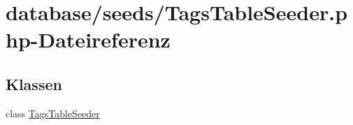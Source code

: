 \hypertarget{TagsTableSeeder_8php}{}\section{database/seeds/\+Tags\+Table\+Seeder.php-\/\+Dateireferenz}
\label{TagsTableSeeder_8php}
\subsection*{Klassen}
\begin{DoxyCompactItemize}
\item 
class \hyperlink{classTagsTableSeeder}{Tags\+Table\+Seeder}
\end{DoxyCompactItemize}
